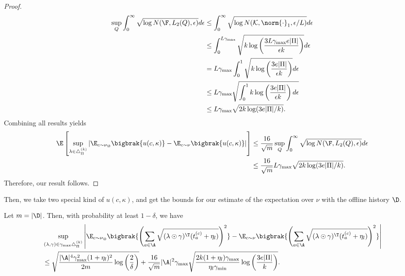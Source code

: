 \documentclass{article}
\newcommand{\mc}[1]{\mathcal{#1}}
\newcommand{\1}{\mathbf{1}}
\begin{document}
\begin{proof}
\begin{align*}
    \sup_Q \int_{0}^{\infty} \sqrt{\log N(\F, L_2(Q), \epsilon)} d \epsilon &\leq \int_{0}^{\infty} \sqrt{\log N(\mc{K}, \norm{\cdot}_1, \epsilon/L)} d \epsilon\\
    &\leq \int_{0}^{L\gamma_{\max}} \sqrt{k\log \left(\frac{3L\gamma_{\max} e|\Pi|}{\epsilon k}\right)} d \epsilon\\
    &= L\gamma_{\max} \int_{0}^{1} \sqrt{k\log \left(\frac{3e|\Pi|}{\epsilon k}\right)} d \epsilon\\
    &\leq L\gamma_{\max} \sqrt{\int_{0}^{1} k\log \left(\frac{3e|\Pi|}{\epsilon k}\right) d \epsilon}\\
    &\leq L\gamma_{\max}\sqrt{2k\log(3e|\Pi|/k)}.
\end{align*}
Combining all results yields
\begin{align*}
    \E\left[\sup_{\lambda\in\triangle_\Pi^{(k)}}\left|\E_{c\sim\nu_\D}\bigbrak{u(c,\kappa)}-\E_{c\sim\nu}\bigbrak{u(c,\kappa)}\right|\right] &\leq \frac{16}{\sqrt{m}}\sup_Q \int_{0}^{\infty} \sqrt{\log N(\F, L_2(Q), \epsilon)} d \epsilon\\
    &\leq \frac{16}{\sqrt{m}}L\gamma_{\max}\sqrt{2k\log(3e|\Pi|/k)}.
\end{align*}
Therefore, our result follows. 
\end{proof}

Then, we take two special kind of $u(c,\kappa)$, and get the bounds for our estimate of the expectation over $\nu$ with the offline history $\D$. 

\begin{lemma}\label{lem:history_1}
Let $m=|\D|$. Then, with probability at least $1-\delta$, we have 
{
\small
\begin{align*}
    &\sup_{(\lambda,\gamma)\in\gamma_{\max}\triangle_\Pi^{(k)}}\left|\E_{c\sim\nu_\D}\bigbrak{\left(\sum_{a\in\A}\sqrt{(\lambda\odot\gamma)^\T (t_{a}^{(c)}+\eta_l)}\right)^2}-\E_{c\sim\nu}\bigbrak{\left(\sum_{a\in\A}\sqrt{(\lambda\odot\gamma)^\T (t_{a}^{(c)}+\eta_l)}\right)^2}\right|\\
    &\leq \sqrt{\frac{|\A|^4\gamma_{\max}^2(1+\eta_l)^2}{2m}\log\left(\frac{2}{\delta}\right)}+\frac{16}{\sqrt{m}}|\A|^2\gamma_{\max}\sqrt{\frac{2k(1+\eta_l)\gamma_{\max}}{\eta_l\gamma_{\min}}\log\left(\frac{3e|\Pi|}{k}\right)}.
\end{align*}
}
\end{lemma}
\end{document}
